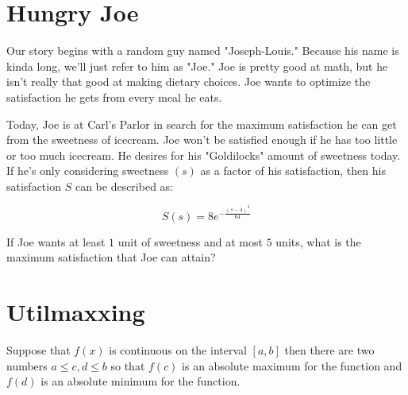 
\setcounter{chapter}{0}
\chapter{Hungry Joe}
Our story begins with a random guy named "Joseph-Louis."
Because his name is kinda long, we'll just refer to him as "Joe."
Joe is pretty good at math, but he isn't really that good at making dietary choices.
Joe wants to optimize the satisfaction he gets from every meal he eats.

Today, Joe is at Carl's Parlor in search for the maximum satisfaction he can get from the sweetness of icecream.
Joe won't be satisfied enough if he has too little or too much icecream.
He desires for his "Goldilocks" amount of sweetness today.
If he's only considering sweetness $(s)$ as a factor of his satisfaction, then his satisfaction $S$ can be described as:\par
\Large
\begin{equation}
	S(s) = 8e^{-\frac{(s-4)^2}{64}}
\end{equation}
\normalsize
\begin{eg}
	If Joe wants at least $1$ unit of sweetness and at most $5$ units, what is the maximum satisfaction that Joe can attain?
\end{eg}
\setcounter{chapter}{1}
\chapter{Utilmaxxing}

\begin{theorem}
	Suppose that \(f\left( x \right)\) is continuous on the interval \(\left[ {a,b} \right]\) then there are two numbers \(a \le c,d \le b\) so that \(f\left( c \right)\) is an absolute maximum for the function and \(f\left( d \right)\) is an absolute minimum for the function.
\end{theorem}